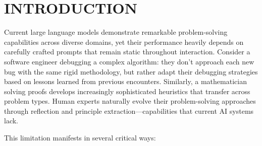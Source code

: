 \documentclass[10pt,a4paper,twocolumn]{article}
\begin{document}
\linebreak
\linebreak 




\let\thefootnote\relax{}


\linebreak
\linebreak



\section{INTRODUCTION}


Current large language models demonstrate remarkable problem-solving capabilities across diverse domains, yet their performance heavily depends on carefully crafted prompts that remain static throughout interaction. Consider a software engineer debugging a complex algorithm: they don't approach each new bug with the same rigid methodology, but rather adapt their debugging strategies based on lessons learned from previous encounters. Similarly, a mathematician solving proofs develops increasingly sophisticated heuristics that transfer across problem types. Human experts naturally evolve their problem-solving approaches through reflection and principle extraction—capabilities that current AI systems lack.

This limitation manifests in several critical ways:
\end{document}
